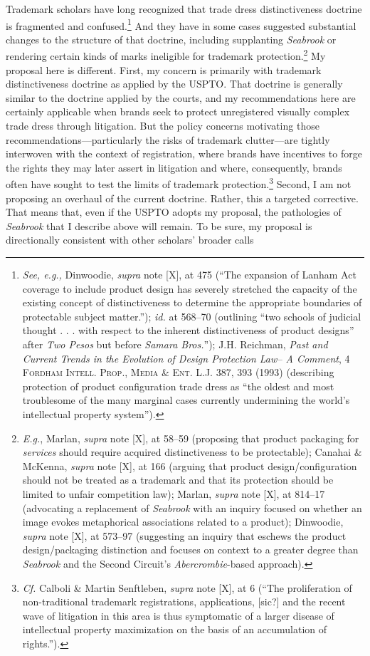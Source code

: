 \documentclass[letterpaper, 11pt, oneside]{article}
\begin{document}
Trademark scholars have long recognized that trade dress distinctiveness doctrine is fragmented and confused.\footnote{\textit{See, e.g.,} Dinwoodie, \textit{supra} note [X], at 475 (``The expansion of Lanham Act coverage to include product design has severely stretched the capacity of the existing concept of distinctiveness to determine the appropriate boundaries of protectable subject matter.''); \textit{id.} at 568–70 (outlining ``two schools of judicial thought . . . with respect to the inherent distinctiveness of product designs'' after \textit{Two Pesos} but before \textit{Samara Bros.}''); J.H. Reichman, \textit{Past and Current Trends in the Evolution of Design Protection Law– A Comment}, 4 \textsc{Fordham Intell. Prop., Media \& Ent. L.J.} 387, 393 (1993) (describing protection of product configuration trade dress as ``the oldest and most troublesome of the many marginal cases currently undermining the world's intellectual property system'').} And they have in some cases suggested substantial changes to the structure of that doctrine, including supplanting \textit{Seabrook} or rendering certain kinds of marks ineligible for trademark protection.\footnote{\textit{E.g.}, Marlan, \textit{supra} note [X], at 58–59 (proposing that product packaging for \textit{services} should require acquired distinctiveness to be protectable); Canahai \& McKenna, \textit{supra} note [X], at 166 (arguing that product design/configuration should not be treated as a trademark and that its protection should be limited to unfair competition law); Marlan, \textit{supra} note [X], at 814–17 (advocating a replacement of \textit{Seabrook} with an inquiry focused on whether an image evokes metaphorical associations related to a product); Dinwoodie, \textit{supra} note [X], at 573–97 (suggesting an inquiry that eschews the product design/packaging distinction and focuses on context to a greater degree than \textit{Seabrook} and the Second Circuit's \textit{Abercrombie}-based approach).} My proposal here is different. First, my concern is primarily with trademark distinctiveness doctrine as applied by the USPTO. That doctrine is generally similar to the doctrine applied by the courts, and my recommendations here are certainly applicable when brands seek to protect unregistered visually complex trade dress through litigation. But the policy concerns motivating those recommendations—particularly the risks of trademark clutter—are tightly interwoven with the context of registration, where brands have incentives to forge the rights they may later assert in litigation and where, consequently, brands often have sought to test the limits of trademark protection.\footnote{\textit{Cf.} Calboli \& Martin Senftleben, \textit{supra} note [X], at 6 (``The proliferation of non-traditional trademark registrations, applications, [sic?] and the recent wave of litigation in this area is thus symptomatic of a larger disease of intellectual property maximization on the basis of an accumulation of rights.'').} Second, I am not proposing an overhaul of the current doctrine. Rather, this a targeted corrective. That means that, even if the USPTO adopts my proposal, the pathologies of \textit{Seabrook} that I describe above will remain. To be sure, my proposal is directionally consistent with other scholars' broader calls 
\end{document}
